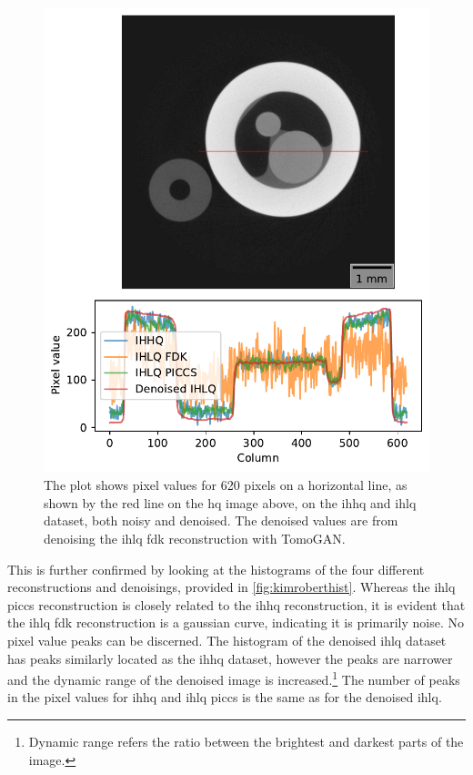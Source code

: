 \begin{figure}[htbp]
  \centering
  \includegraphics[width=.95\textwidth]{figures/kimrobertline.pdf}
  \caption[Pixel value plot of IHHQ and IHLQ, noisy and denoised]{The plot shows pixel values for 620 pixels on a horizontal line, as shown by the red line on the \gls{hq} image above, on the \gls{ihhq} and \gls{ihlq} dataset, both noisy and denoised. The denoised values are from denoising the \gls{ihlq} \gls{fdk} reconstruction with TomoGAN. }
  \label{fig:kimrobertline}
\end{figure}

This is further confirmed by looking at the histograms of the four different reconstructions and denoisings, provided in \cref{fig:kimroberthist}. Whereas the \gls{ihlq} \gls{piccs} reconstruction is closely related to the \gls{ihhq} reconstruction, it is evident that the \gls{ihlq} \gls{fdk} reconstruction is a gaussian curve, indicating it is primarily noise. No pixel value peaks can be discerned. The histogram of the denoised \gls{ihlq} dataset has peaks similarly located as the \gls{ihhq} dataset, however the peaks are narrower and the dynamic range of the denoised image is increased.\footnote{Dynamic range refers the ratio between the brightest and darkest parts of the image. } The number of peaks in the pixel values for \gls{ihhq} and \gls{ihlq} \gls{piccs} is the same as for the denoised \gls{ihlq}. 

